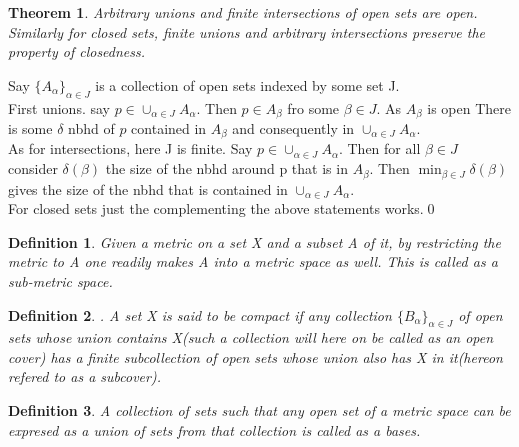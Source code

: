 \documentclass{myclass}
\newtheorem*{definition}{Definition}
\newtheorem*{theorem}{Theorem}
\begin{document}
\begin{theorem}
    Arbitrary unions and finite intersections of open sets are open. Similarly for closed sets, finite unions and arbitrary intersections preserve the property of closedness.
\end{theorem}
\begin{prf}
    Say $\{A_\alpha\}_{\alpha\in J}$ is a collection of open sets indexed by some set J.\\
    First unions. say $p\in \cup_{\alpha\in J}A_\alpha$. Then $p\in A_{\beta}$ fro some $\beta\in J$. As $A_\beta$ is open
    There is some $\delta$ nbhd of $p$ contained in $A_\beta$ and consequently in $\cup_{\alpha\in J}A_\alpha$.
    \\
    As for intersections, here J is finite. Say $p\in \cup_{\alpha\in J}A_\alpha$. Then for all $\beta\in J$ consider $\delta(\beta)$ the size of the nbhd around p that is in 
    $A_\beta$. Then $\min_{\beta\in J}\delta(\beta)$ gives the size of the nbhd that is contained in $\cup_{\alpha\in J}A_\alpha$.\\
    For closed sets just the complementing the above statements works.\qed
\end{prf}

\begin{definition}
    Given a metric on a set X and a subset A of it, by restricting the metric to A one readily makes A into a metric space as well. This is called as a sub-metric space.
\end{definition}

\begin{definition}
    . A set X is said to be compact if any collection $\{B_\alpha\}_{\alpha\in J}$ of open sets whose union contains X(such a collection will here on be called as an open cover) has a 
    finite subcollection of open sets whose union also has X in it(hereon refered to as a subcover).
\end{definition}

\begin{definition}
    A collection of sets such that any open set of a metric space can be expresed as a union of sets from that collection is called as 
    a bases.
\end{definition}
\end{document}
